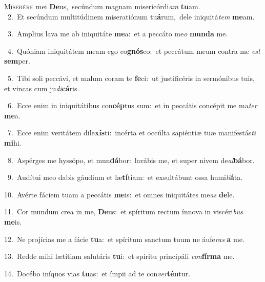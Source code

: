\lettrine{\initial\textcolor{\initialcolor}{M}}{iserére} mei \textbf{De}\-us,~\star secúndum magnam misericórdi\textit{am} \textbf{tu}\-am.\\
{\numbfont\textcolor{\numbcolor}{~2.}}~Et secúndum multitúdinem miseratiónum tu\-\textbf{á}\-rum,~\star dele iniquitá\textit{tem} \textbf{me}\-am.\par
{\numbfont\textcolor{\numbcolor}{~3.}}~Amplius lava me ab iniquitáte \textbf{me}\-a:~\star et a peccáto me\textit{o} \textbf{mun}\-\textbf{da} me.\par
{\numbfont\textcolor{\numbcolor}{~4.}}~Quóniam iniquitátem meam ego co\-\textbf{gnós}\-co:~\star et peccátum meum contra me \textit{est} \textbf{sem}\-per.\par
{\numbfont\textcolor{\numbcolor}{~5.}}~Tibi soli peccávi, et malum coram te \textbf{fe}\-ci:~\star ut justificéris in sermónibus tuis, et vincas cum ju\-\textit{di}\-\textbf{cá}ris.\par
{\numbfont\textcolor{\numbcolor}{~6.}}~Ecce enim in iniquitátibus con\-\textbf{cép}\-tus sum:~\star et in peccátis concépit me ma\textit{ter} \textbf{me}\-a.\par
{\numbfont\textcolor{\numbcolor}{~7.}}~Ecce enim veritátem dile\-\textbf{xís}\-ti:~\star incérta et occúlta sapiéntiæ tuæ manifestás\textit{ti} \textbf{mi}\-hi.\par
{\numbfont\textcolor{\numbcolor}{~8.}}~Aspérges me hyssópo, et mun\-\textbf{dá}\-bor:~\star lavábis me, et super nivem de\-\textit{al}\-\textbf{bá}bor.\par
{\numbfont\textcolor{\numbcolor}{~9.}}~Audítui meo dabis gáudium et læ\-\textbf{tí}\-tiam:~\star et exsultábunt ossa humi\-\textit{li}\-\textbf{á}ta.\par
{\numbfont\textcolor{\numbcolor}{10.}}~Avérte fáciem tuam a peccátis \textbf{me}\-is:~\star et omnes iniquitátes me\textit{as} \textbf{de}\-le.\par
{\numbfont\textcolor{\numbcolor}{11.}}~Cor mundum crea in me, \textbf{De}\-us:~\star et spíritum rectum ínnova in viscéri\textit{bus} \textbf{me}\-is.\par
{\numbfont\textcolor{\numbcolor}{12.}}~Ne projícias me a fácie \textbf{tu}\-a:~\star et spíritum sanctum tuum ne áufe\textit{ras} \textbf{a} me.\par
{\numbfont\textcolor{\numbcolor}{13.}}~Redde mihi lætítiam salutáris \textbf{tu}\-i:~\star et spíritu principáli \textit{con}\-\textbf{fír}\textbf{ma} me.\par
{\numbfont\textcolor{\numbcolor}{14.}}~Docébo iníquos vias \textbf{tu}\-as:~\star et ímpii ad te con\-\textit{ver}\-\textbf{tén}tur.\par
